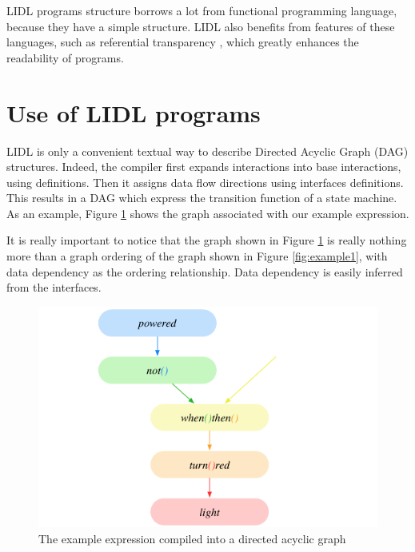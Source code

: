 \documentclass[10pt]{sigplanconf}
\begin{document}
LIDL programs structure borrows a lot from functional programming language, because they have a simple structure. LIDL also benefits from features of these languages, such as referential transparency \cite{Sondergaard:1990aa}, which greatly enhances the readability of programs.




\section{Use of LIDL programs}

\label{sect:use}


LIDL is only a convenient textual way to describe Directed Acyclic Graph (DAG) structures. Indeed, the compiler first expands interactions into base interactions, using definitions. Then it assigns data flow directions using interfaces definitions. This results in a DAG which express the transition function of a state machine. As an example, Figure \ref{fig:example1comp} shows the graph associated with our example expression. 

It is really important to notice that the graph shown in Figure \ref{fig:example1comp} is really nothing more than a graph ordering of the graph shown in Figure \ref{fig:example1}, with data dependency as the ordering relationship. Data dependency is easily inferred from the interfaces.

\begin{figure}[h]
\centering
\includegraphics[width=\linewidth,height=\linewidth,keepaspectratio]{figures/example1comp.pdf}
\caption{The example expression compiled into a directed acyclic graph} 
\label{fig:example1comp}
\end{figure}
\end{document}
